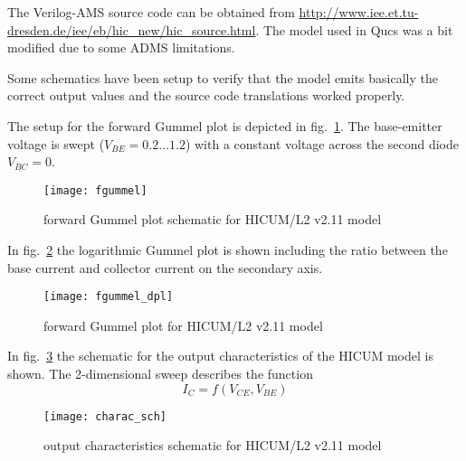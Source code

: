 \addvspace{12pt}

The Verilog-AMS source code can be obtained from
\url{http://www.iee.et.tu-dresden.de/iee/eb/hic_new/hic_source.html}.
The model used in Qucs was a bit modified due to some ADMS
limitations.

\addvspace{12pt}

Some schematics have been setup to verify that the model emits
basically the correct output values and the source code translations
worked properly.


The setup for the forward Gummel plot is depicted in
fig.~\ref{fig:fgummel}.  The base-emitter voltage is swept ($V_{BE} =
0.2\dots 1.2$) with a constant voltage across the second diode $V_{BC}
= 0$.

\begin{figure}[ht]
\begin{center}
\texttt{[image: fgummel]}
\end{center}
\caption{forward Gummel plot schematic for HICUM/L2 v2.11 model}
\label{fig:fgummel}
\end{figure}
\FloatBarrier

In fig.~\ref{fig:fgummel_dpl} the logarithmic Gummel plot is shown
including the ratio between the base current and collector current on
the secondary axis.

\begin{figure}[ht]
\begin{center}
\texttt{[image: fgummel\_dpl]}
\end{center}
\caption{forward Gummel plot for HICUM/L2 v2.11 model}
\label{fig:fgummel_dpl}
\end{figure}
\FloatBarrier


In fig.~\ref{fig:charac_sch} the schematic for the output
characteristics of the HICUM model is shown.  The 2-dimensional sweep
describes the function
\begin{equation}
I_C = f\left(V_{CE}, V_{BE}\right)
\end{equation}

\begin{figure}[ht]
\begin{center}
\texttt{[image: charac\_sch]}
\end{center}
\caption{output characteristics schematic for HICUM/L2 v2.11 model}
\label{fig:charac_sch}
\end{figure}
\FloatBarrier

